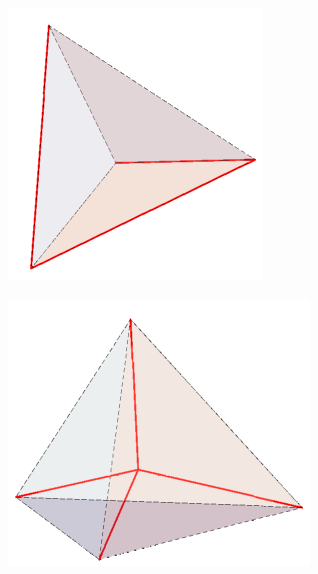 \documentclass[b1paper,portrait]{template/baposter}
\begin{document}
\begin{poster}
{\begin{center}
	 	\begin{minipage}{0.35\linewidth}
			\includegraphics[width=\linewidth]{Put1}
		\end{minipage}
		\hspace{30pt}
	 	\begin{minipage}{0.35\linewidth}
			\includegraphics[width=\linewidth]{Put4}
		\end{minipage}
	\end{center}
	 \vspace{0.2cm}
}




\end{poster}
\end{document}

